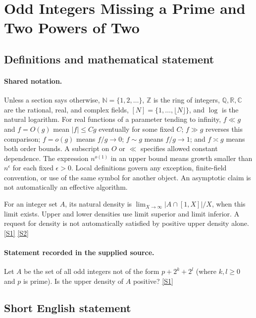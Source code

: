 \documentclass[11pt,a4paper]{article}
\newcommand{\N}{\mathbb{N}}
\newcommand{\Z}{\mathbb{Z}}
\newcommand{\Q}{\mathbb{Q}}
\newcommand{\R}{\mathbb{R}}
\newcommand{\C}{\mathbb{C}}
\newcommand{\sref}[2]{\hyperlink{source:#1:#2}{[S#2]}}
\begin{document}
\section{Odd Integers Missing a Prime and Two Powers of Two}\label{statement}


\subsection{Definitions and mathematical statement}

\paragraph{Shared notation.}Unless a section says otherwise, $\N=\{1,2,\ldots\}$,
$\Z$ is the ring of integers, $\Q,\R,\C$ are the rational, real, and complex
fields, $[N]=\{1,\ldots,\lfloor N\rfloor\}$, and $\log$ is the natural
logarithm. For real functions of a parameter tending to infinity,
$f\ll g$ and $f=O(g)$ mean $|f|\leq Cg$ eventually for some fixed $C$;
$f\gg g$ reverses this comparison; $f=o(g)$ means $f/g\to0$;
$f\sim g$ means $f/g\to1$; and $f\asymp g$ means both order bounds.
A subscript on $O$ or $\ll$ specifies allowed constant dependence.
The expression $n^{o(1)}$ in an upper bound means growth smaller than
$n^\epsilon$ for each fixed $\epsilon>0$. Local definitions govern any
exception, finite-field convention, or use of the same symbol for another
object. An asymptotic claim is not automatically an effective algorithm.



For an integer set $A$, its natural density is $\lim_{X\to\infty}|A\cap[1,X]|/X$, when this limit exists. Upper and lower densities use limit superior and limit inferior. A request for density is not automatically satisfied by positive upper density alone. \sref{statement}{1} \sref{statement}{2}

\paragraph{Statement recorded in the supplied source.}
Let $A$ be the set of all odd integers not of the form $p+2^{k}+2^l$ (where $k,l\geq 0$ and $p$ is prime). Is the upper density of $A$ positive? \sref{statement}{1}

\subsection{Short English statement}
\end{document}
